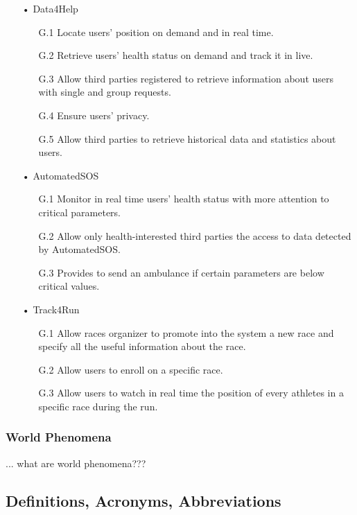 \begin{enumerate}
\item[•] {\Large Data4Help}
	\begin{enumerate}
		\item [G.1] Locate users' position on demand and in real time.
		\item [G.2] Retrieve users’ health status on demand and track it in live.
		\item [G.3] Allow third parties registered to retrieve information about users with 				single and group requests.
		\item [G.4] Ensure users' privacy.
		\item [G.5] Allow third parties to retrieve historical data and statistics about 				users.
	\end{enumerate}
	
\item[•] {\Large AutomatedSOS}
	\begin{enumerate}
		\item [G.1] Monitor in real time users’ health status with more attention to 					critical parameters.
		\item [G.2] Allow only health-interested third parties the access to data detected 				by AutomatedSOS.
		\item [G.3] Provides to send an ambulance if certain parameters are below critical 				values.
	\end{enumerate}
	
\item[•] {\Large Track4Run}	
	\begin{enumerate}
		\item [G.1] Allow races organizer to promote into the system a new race and specify 			all the useful information about the race.
		\item [G.2] Allow users to enroll on a specific race.
		\item [G.3] Allow users to watch in real time the position of every athletes in a 				specific race during the run.
	\end{enumerate}
\end{enumerate}

\subsubsection{World Phenomena}
... what are world phenomena???

\subsection{Definitions, Acronyms, Abbreviations}

